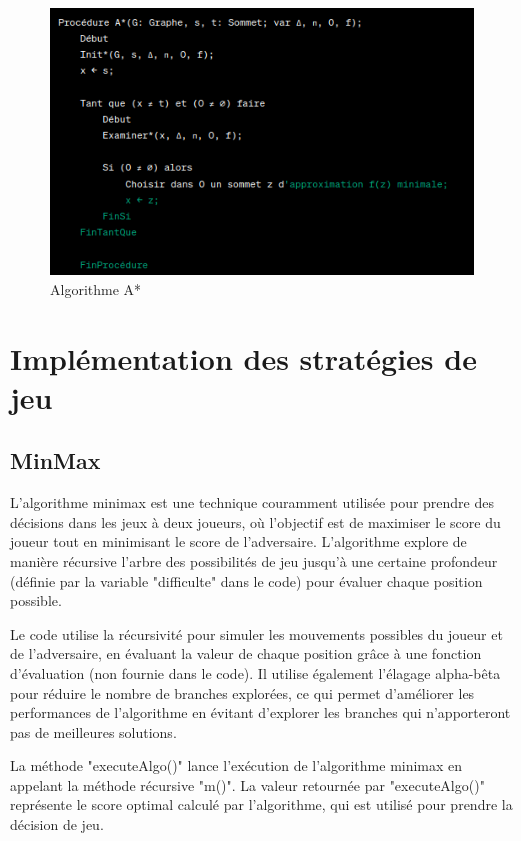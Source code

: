 \documentclass[12pt]{article}
\begin{document}
	\begin{figure}[H]
	\centering
	\includegraphics[scale=0.7]{img/A}
	\caption{Algorithme A* }
	\label{Algorithme A*}
\end{figure}


\section{Implémentation des stratégies de jeu}
	\subsection{MinMax}
	L'algorithme minimax est une technique couramment utilisée pour prendre des décisions dans les jeux à deux joueurs, où l'objectif est de maximiser le score du joueur tout en minimisant le score de l'adversaire. L'algorithme explore de manière récursive l'arbre des possibilités de jeu jusqu'à une certaine profondeur (définie par la variable "difficulte" dans le code) pour évaluer chaque position possible.
	
	Le code utilise la récursivité pour simuler les mouvements possibles du joueur et de l'adversaire, en évaluant la valeur de chaque position grâce à une fonction d'évaluation (non fournie dans le code). Il utilise également l'élagage alpha-bêta pour réduire le nombre de branches explorées, ce qui permet d'améliorer les performances de l'algorithme en évitant d'explorer les branches qui n'apporteront pas de meilleures solutions.
	
	
	La méthode "executeAlgo()" lance l'exécution de l'algorithme minimax en appelant la méthode récursive "m()". La valeur retournée par "executeAlgo()" représente le score optimal calculé par l'algorithme, qui est utilisé pour prendre la décision de jeu.
	
\end{document}
